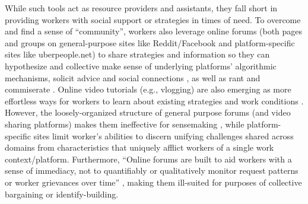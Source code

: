 While such tools act as resource providers and assistants, they {fall short in} provid{ing} workers with social support or strategies in times of need. To overcome  and find a sense of   ``community'',  workers also {}leverage online forums (both {pages and groups on general-purpose sites like Reddit/Facebook} and platform-specific sites like uberpeople.net) to share strategies \cite{nomad} and information \cite{machines, peersupport} {so they can hypothesize and collective make sense of underlying platforms' algorithmic mechanisms}, solicit advice and social connections \cite{belonging, organizing}, as well as rant and commiserate \cite{privacy, atom}.  
Online video tutorials (e.g., vlogging) are also emerging as more effortless ways for workers to learn about existing strategies and work conditions \cite{chan2019becoming, pires2024delivery, woodside2021bottom}.
However, the loosely-organized structure of general purpose forums (and video sharing platforms) {makes them in}effective for sensemaking \cite{peersupport}, while platform-specific sites limit {worker's abilities to discern unifying challenges shared across domains from characteristics that uniquely afflict workers of a single work context/platform}.
{Furthermore, ``Online forums are built to aid workers with a sense of immediacy, not to quantifiably or qualitatively monitor
request patterns or worker grievances over time'' \cite{organizing}, making them ill-suited for purposes of collective bargaining or identify-building.}
\vspace{-1mm}

\vspace{-1mm}